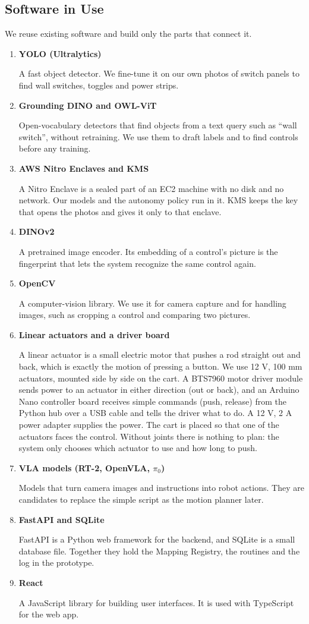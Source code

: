\documentclass[conference]{IEEEtran}
\newcommand{\itemhead}[1]{\item \textbf{#1}\par\nobreak}
\begin{document}
\subsection{Software in Use}
We reuse existing software and build only the parts that connect it.
\begin{enumerate}
\itemhead{YOLO (Ultralytics)}
A fast object detector. We fine-tune it on our own photos of switch panels to find wall switches, toggles and power strips.

\itemhead{Grounding DINO and OWL-ViT}
Open-vocabulary detectors that find objects from a text query such as ``wall switch'', without retraining. We use them to draft labels and to find controls before any training.

\itemhead{AWS Nitro Enclaves and KMS}
A Nitro Enclave is a sealed part of an EC2 machine with no disk and no network. Our models and the autonomy policy run in it. KMS keeps the key that opens the photos and gives it only to that enclave.

\itemhead{DINOv2}
A pretrained image encoder. Its embedding of a control's picture is the fingerprint that lets the system recognize the same control again.

\itemhead{OpenCV}
A computer-vision library. We use it for camera capture and for handling images, such as cropping a control and comparing two pictures.

\itemhead{Linear actuators and a driver board}
A linear actuator is a small electric motor that pushes a rod straight out and back, which is exactly the motion of pressing a button. We use 12 V, 100 mm actuators, mounted side by side on the cart. A BTS7960 motor driver module sends power to an actuator in either direction (out or back), and an Arduino Nano controller board receives simple commands (push, release) from the Python hub over a USB cable and tells the driver what to do. A 12 V, 2 A power adapter supplies the power. The cart is placed so that one of the actuators faces the control. Without joints there is nothing to plan: the system only chooses which actuator to use and how long to push.

\itemhead{VLA models (RT-2, OpenVLA, $\pi_0$)}
Models that turn camera images and instructions into robot actions. They are candidates to replace the simple script as the motion planner later.

\itemhead{FastAPI and SQLite}
FastAPI is a Python web framework for the backend, and SQLite is a small database file. Together they hold the Mapping Registry, the routines and the log in the prototype.

\itemhead{React}
A JavaScript library for building user interfaces. It is used with TypeScript for the web app.

\end{enumerate}
\end{document}
